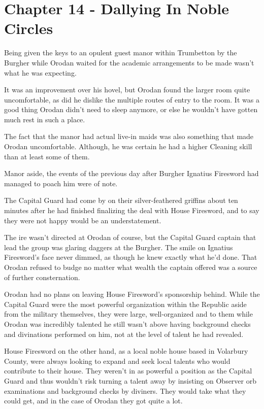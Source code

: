 \documentclass[a4paper,10pt]{book}
\begin{document}
\section*{Chapter 14 - Dallying In Noble Circles}
%
\par
Being given the keys to an opulent guest manor within Trumbetton by the Burgher while Orodan waited for the academic arrangements to be made wasn’t what he was expecting.\par
It was an improvement over his hovel, but Orodan found the larger room quite uncomfortable, as did he dislike the multiple routes of entry to the room. It was a good thing Orodan didn’t need to sleep anymore, or else he wouldn’t have gotten much rest in such a place.\par
The fact that the manor had actual live-in maids was also something that made Orodan uncomfortable. Although, he was certain he had a higher Cleaning skill than at least some of them.\par
Manor aside, the events of the previous day after Burgher Ignatius Firesword had managed to poach him were of note.\par
The Capital Guard had come by on their silver-feathered griffins about ten minutes after he had finished finalizing the deal with House Firesword, and to say they were not happy would be an understatement.\par
The ire wasn’t directed at Orodan of course, but the Capital Guard captain that lead the group was glaring daggers at the Burgher. The smile on Ignatius Firesword’s face never dimmed, as though he knew exactly what he’d done. That Orodan refused to budge no matter what wealth the captain offered was a source of further consternation.\par
Orodan had no plans on leaving House Firesword’s sponsorship behind. While the Capital Guard were the most powerful organization within the Republic aside from the military themselves, they were large, well-organized and to them while Orodan was incredibly talented he still wasn’t above having background checks and divinations performed on him, not at the level of talent he had revealed.\par
House Firesword on the other hand, as a local noble house based in Volarbury County, were always looking to expand and seek local talents who would contribute to their house. They weren’t in as powerful a position as the Capital Guard and thus wouldn’t risk turning a talent away by insisting on Observer orb examinations and background checks by diviners. They would take what they could get, and in the case of Orodan they got quite a lot.\par
\end{document}
